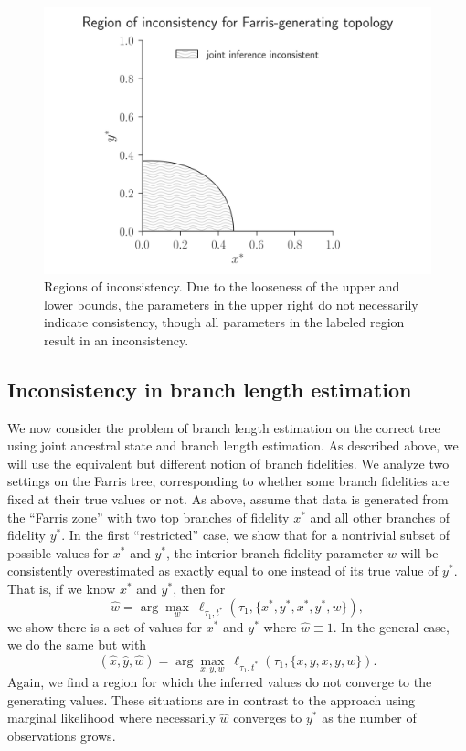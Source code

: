 \documentclass{article}
\begin{document}
\begin{figure}
\centering
\includegraphics[width=\textwidth]{topology-inconsistency-inkscape}
\caption{
    Regions of inconsistency.
    Due to the looseness of the upper and lower bounds, the parameters in the upper right do not necessarily indicate consistency, though all parameters in the labeled region result in an inconsistency.
}
\label{fig:inconsistency-farris}
\end{figure}

\subsection*{Inconsistency in branch length estimation}

We now consider the problem of branch length estimation on the correct tree using joint ancestral state and branch length estimation.
As described above, we will use the equivalent but different notion of branch fidelities.
We analyze two settings on the Farris tree, corresponding to whether some branch fidelities are fixed at their true values or not.
As above, assume that data is generated from the ``Farris zone'' with two top branches of fidelity $x^*$ and all other branches of fidelity $y^*$.
In the first ``restricted'' case, we show that for a nontrivial subset of possible values for $x^*$ and $y^*$, the interior branch fidelity parameter $w$ will be consistently overestimated as exactly equal to one instead of its true value of $y^*$.
That is, if we know $x^*$ and $y^*$, then for
$$
\hat{w} = \arg\max_{w} \ \ell_{\tau_1,t^*}(\tau_1, \{x^*,y^*,x^*,y^*,w\}),
$$
we show there is a set of values for $x^*$ and $y^*$ where $\hat{w}\equiv 1$.
In the general case, we do the same but with
$$
(\hat{x}, \hat{y}, \hat{w}) = \arg\max_{x,y,w} \ \ell_{\tau_1,t^*}(\tau_1, \{x,y,x,y,w\}).
$$
Again, we find a region for which the inferred values do not converge to the generating values.
These situations are in contrast to the approach using marginal likelihood where necessarily $\hat{w}$ converges to $y^*$ as the number of observations grows.
\end{document}
